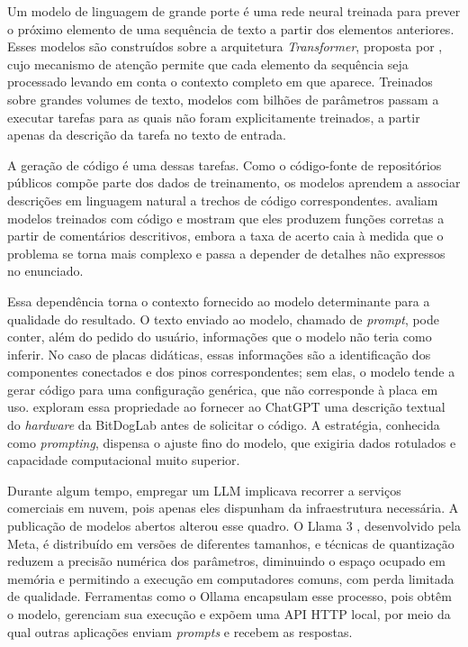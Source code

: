 Um modelo de linguagem de grande porte é uma rede neural treinada para prever o próximo elemento de uma sequência de texto a partir dos elementos anteriores. Esses modelos são construídos sobre a arquitetura \textit{Transformer}, proposta por , cujo mecanismo de atenção permite que cada elemento da sequência seja processado levando em conta o contexto completo em que aparece. Treinados sobre grandes volumes de texto, modelos com bilhões de parâmetros passam a executar tarefas para as quais não foram explicitamente treinados, a partir apenas da descrição da tarefa no texto de entrada.

A geração de código é uma dessas tarefas. Como o código-fonte de repositórios públicos compõe parte dos dados de treinamento, os modelos aprendem a associar descrições em linguagem natural a trechos de código correspondentes.  avaliam modelos treinados com código e mostram que eles produzem funções corretas a partir de comentários descritivos, embora a taxa de acerto caia à medida que o problema se torna mais complexo e passa a depender de detalhes não expressos no enunciado.

Essa dependência torna o contexto fornecido ao modelo determinante para a qualidade do resultado. O texto enviado ao modelo, chamado de \textit{prompt}, pode conter, além do pedido do usuário, informações que o modelo não teria como inferir. No caso de placas didáticas, essas informações são a identificação dos componentes conectados e dos pinos correspondentes; sem elas, o modelo tende a gerar código para uma configuração genérica, que não corresponde à placa em uso.  exploram essa propriedade ao fornecer ao ChatGPT uma descrição textual do \textit{hardware} da BitDogLab antes de solicitar o código. A estratégia, conhecida como \textit{prompting}, dispensa o ajuste fino do modelo, que exigiria dados rotulados e capacidade computacional muito superior.

Durante algum tempo, empregar um LLM implicava recorrer a serviços comerciais em nuvem, pois apenas eles dispunham da infraestrutura necessária. A publicação de modelos abertos alterou esse quadro. O Llama 3 \cite{grattafiori2024}, desenvolvido pela Meta, é distribuído em versões de diferentes tamanhos, e técnicas de quantização reduzem a precisão numérica dos parâmetros, diminuindo o espaço ocupado em memória e permitindo a execução em computadores comuns, com perda limitada de qualidade. Ferramentas como o Ollama \cite{ollama2026} encapsulam esse processo, pois obtêm o modelo, gerenciam sua execução e expõem uma API HTTP local, por meio da qual outras aplicações enviam \textit{prompts} e recebem as respostas.

